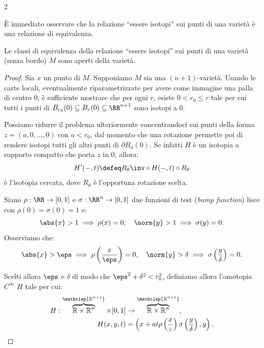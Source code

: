 \begin{multicols*}{2}
    \begin{remark}
        È immediato osservare che la relazione ``essere isotopi'' sui punti di una varietà è una relazione di equivalenza.
    \end{remark}

    \begin{lemma} \label{lem:classi_equivalenza_aperte}
        Le classi di equivalenza della relazione ``essere isotopi'' sui
        punti di una varietà (senza bordo) $M$ sono aperti della varietà.
    \end{lemma}

    \begin{proof}
        Sia $x$ un punto di $M$. Supponiamo $M$ sia una $(n+1)$-varietà.
        Usando le carte locali, eventualmente riparametrizzate
        per avere come immagine una palla di centro $0$, è sufficiente mostrare
        che per ogni $r$, esiste $0 < r_0 \leq r$ tale per cui
        tutti i punti di $B_{r_0}(0) \subseteq B_r(0) \subseteq \RR^{n+1}$ sono isotopi a $0$. \smallskip

        Possiamo ridurre il problema ulteriormente concentrandoci sui punti
        della forma $z = (a, 0, \ldots, 0)$ con $a < r_0$, dal momento che una rotazione
        permette poi di rendere isotopi tutti gli altri punti di $\partial B_a(0)$. Se
        infatti $H$ è un isotopia a supporto compatto che porta $z$ in $0$, allora:
        \[ H'(-, t) \defeq R_\theta\inv \circ H(-, t) \circ R_\theta \]
        è l'isotopia cercata, dove $R_\theta$ è l'opportuna rotazione scelta. \smallskip

        Siano $\rho : \RR \to [0, 1]$ e $\sigma : \RR^n \to [0, 1]$ due funzioni di test
        (\textit{bump function}) lisce con $\rho(0) = \sigma(0) = 1$ e:
        \[ \abs{x} > 1 \implies \rho(x) = 0, \quad \norm{y} > 1 \implies \sigma(y) = 0. \]
        Osserviamo che:
        \[
            \abs{x} > \eps \implies \rho\left(\frac{x}{\eps}\right) = 0, \quad \norm{y} > \delta \implies \sigma\left(\frac{y}{\delta}\right) = 0.
        \]

        Scelti allora $\eps$ e $\delta$ di modo che $\eps^2 + \delta^2 < r_0^2$, definiamo allora l'omotopia $C^\infty$ $H$ tale per cui:
        \begin{equation*}
            \begin{aligned}
                H : \overbrace{\mathbb{R} \times \mathbb{R}^n}^{\mathclap{\mathbb{R}^{n+1}}} \times [0, 1] & \to \overbrace{\mathbb{R} \times \mathbb{R}^n}^{\mathclap{\mathbb{R}^{n+1}}},                         \\
                H(x, y, t)                                                                                 & = \left(x + a t \rho\left(\frac{x}{\varepsilon}\right) \sigma\left(\frac{y}{\delta}\right), y\right).
            \end{aligned}
        \end{equation*}


\end{proof}
\end{multicols*}
